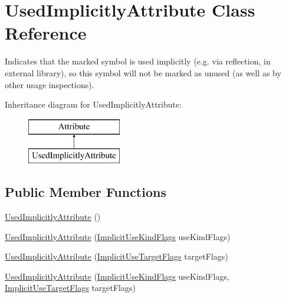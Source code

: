 \hypertarget{class_used_implicitly_attribute}{}\section{Used\+Implicitly\+Attribute Class Reference}
\label{class_used_implicitly_attribute}


Indicates that the marked symbol is used implicitly (e.\+g. via reflection, in external library), so this symbol will not be marked as unused (as well as by other usage inspections).  


Inheritance diagram for Used\+Implicitly\+Attribute\+:\begin{figure}[H]
\begin{center}
\leavevmode
\includegraphics[height=2.000000cm]{class_used_implicitly_attribute}
\end{center}
\end{figure}
\subsection*{Public Member Functions}
\begin{DoxyCompactItemize}
\item 
\mbox{\hyperlink{class_used_implicitly_attribute_a58cbf99ae8d931a919ad26a1299dad17}{Used\+Implicitly\+Attribute}} ()
\item 
\mbox{\hyperlink{class_used_implicitly_attribute_ae2dc37889a97f27f89c986e0e46ad81f}{Used\+Implicitly\+Attribute}} (\mbox{\hyperlink{_annotations_8cs_acc26806cec0b003502b38c6c2ee67fd1}{Implicit\+Use\+Kind\+Flags}} use\+Kind\+Flags)
\item 
\mbox{\hyperlink{class_used_implicitly_attribute_ae1b2c052663335aa4bf2e3ff2510e821}{Used\+Implicitly\+Attribute}} (\mbox{\hyperlink{_annotations_8cs_a59f21202ead30f3d1e2093e42214bf7c}{Implicit\+Use\+Target\+Flags}} target\+Flags)
\item 
\mbox{\hyperlink{class_used_implicitly_attribute_ad9247e3d6829ade0057de0bb0c7e3cbf}{Used\+Implicitly\+Attribute}} (\mbox{\hyperlink{_annotations_8cs_acc26806cec0b003502b38c6c2ee67fd1}{Implicit\+Use\+Kind\+Flags}} use\+Kind\+Flags, \mbox{\hyperlink{_annotations_8cs_a59f21202ead30f3d1e2093e42214bf7c}{Implicit\+Use\+Target\+Flags}} target\+Flags)
\end{DoxyCompactItemize}
